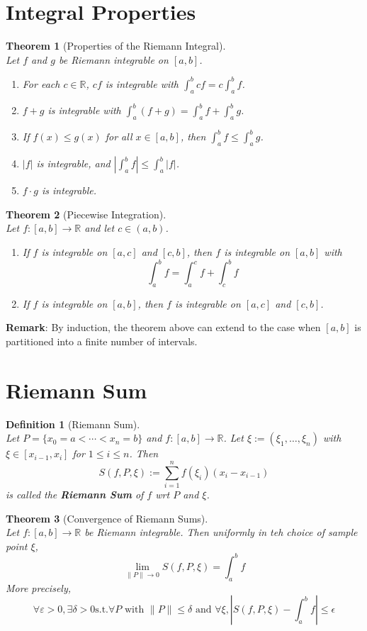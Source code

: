 \documentclass[12pt]{article}
\newtheorem{definition}{Definition}[section]
\newtheorem{theorem}{Theorem}[section]
\theoremstyle{definition}
\begin{document}
\section{Integral Properties}
\begin{theorem}[Properties of the Riemann Integral]
\hfill\\\normalfont Let $f$ and $g$ be Riemann integrable on $[a,b]$.
\begin{enumerate}
	\item For each $c\in\mathbb{R}$, $cf$ is integrable with $\int_a^b cf=c\int_a^bf$.
	\item $f+g$ is integrable with $\int_a^b(f+g)=\int_a^bf+\int_a^bg$.
	\item If $f(x)\leq g(x)$ for all $x\in[a,b]$, then $\int_a^bf\leq \int_a^bg$.
	\item $|f|$ is integrable, and $|\int_a^bf|\leq \int_a^b|f|$.
	\item $f\cdot g$ is integrable.
\end{enumerate}
\end{theorem}
\begin{theorem}[Piecewise Integration]
\hfill\\\normalfont Let $f:[a,b]\to\mathbb{R}$ and let $c\in(a,b)$.
\begin{enumerate}
	\item If $f$ is integrable on $[a,c]$ and $[c,b]$, then $f$ is integrable on $[a,b]$ with
	\[
\int_a^b f=\int_a^c f +\int_c^b f
	\]
	\item If $f$ is integrable on $[a,b]$, then $f$ is integrable on $[a,c]$ and $[c,b]$.
\end{enumerate}
\end{theorem}
\textbf{Remark}: By induction, the theorem above can extend to the case when $[a,b]$ is partitioned into a finite number of intervals.
\clearpage
\section{Riemann Sum}
\begin{definition}[Riemann Sum]
\hfill\\\normalfont Let $P=\{x_0=a<\cdots <x_n=b\}$ and $f:[a,b]\to\mathbb{R}$. Let $\xi:=(\xi_1,\ldots, \xi_n)$ with $\xi\in[x_{i-1},x_i]$ for $1\leq i\leq n$. Then
\[
S(f,P,\xi):=\sum_{i=1}^n f(\xi_i)(x_i-x_{i-1})
\]
is called the \textbf{Riemann Sum} of $f$ wrt $P$ and $\xi$.
\end{definition}
\begin{theorem}[Convergence of Riemann Sums]
\hfill\\\normalfont Let $f:[a,b]\to\mathbb{R}$ be Riemann integrable. Then uniformly in teh choice of sample point $\xi$, 
\[
\lim_{\|P\|\to 0}S(f,P,\xi)=\int_a^b f
\]
More precisely,
\[
\forall \varepsilon>0, \exists \delta>0 \text{s.t.} \forall P \text{ with }\|P\|\leq \delta\text{ and }\forall \xi, |S(f,P,\xi)-\int_a^b f|\leq \epsilon
\]
\end{theorem}
\clearpage
\end{document}

